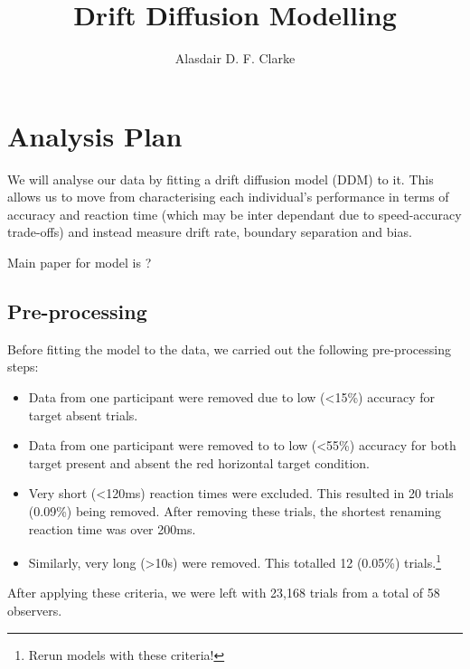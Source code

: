 \documentclass[11pt, twoside, twocolumn]{article}
\title{Drift Diffusion Modelling}
\author[1]{Alasdair D. F. Clarke}
\affil[1]{\small University of Essex, Department of Psychology, Colchester, UK, CO4 3SQ}
\begin{document}
\twocolumn[
  \begin{@twocolumnfalse}
    \maketitle
    \begin{abstract}

\end{abstract}
  \end{@twocolumnfalse}
]




\section{Analysis Plan}

We will analyse our data by fitting a drift diffusion model (DDM) to it. This allows us to move from characterising each individual's performance in terms of accuracy and reaction time (which may be inter dependant due to speed-accuracy trade-offs) and instead measure drift rate, boundary separation and bias. 

Main paper for model is \citep{ratcliff-mckoon2008}?

\subsection{Pre-processing}

Before fitting the model to the data, we carried out the following pre-processing steps:

\begin{itemize}
\item Data from one participant were removed due to low (<15\%) accuracy for target absent trials.\\
\item Data from one participant were removed to to low (<55\%) accuracy for both target present and absent the red horizontal target condition.\\
\item Very short (<120ms) reaction times were excluded. This resulted in 20 trials (0.09\%) being removed. After removing these trials, the shortest renaming reaction time was over 200ms.
\item Similarly, very long (>10s) were removed. This totalled 12 (0.05\%) trials.\footnote{Rerun models with these criteria!}
\end{itemize}

After applying these criteria, we were left with 23,168 trials from a total of 58 observers. 
\end{document}
